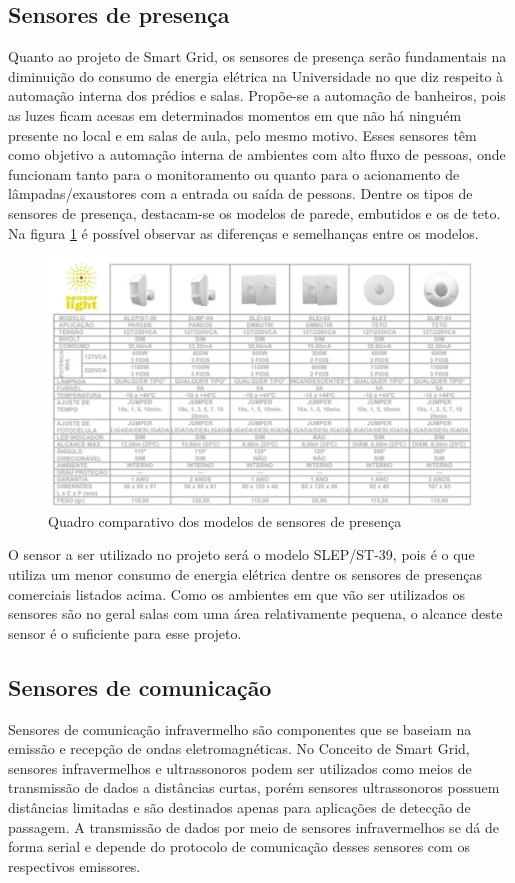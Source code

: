 \subsection{Sensores de presença}
Quanto ao projeto de Smart Grid, os sensores de presença serão fundamentais na diminuição do consumo de energia elétrica na Universidade no que diz respeito à automação interna dos prédios e salas. Propõe-se a automação de banheiros, pois as luzes ficam acesas em determinados momentos em que não há ninguém presente no local e em salas de aula, pelo mesmo motivo. Esses sensores têm como objetivo a automação interna de ambientes com alto fluxo de pessoas, onde funcionam tanto para o monitoramento ou quanto para o acionamento de lâmpadas/exaustores com a entrada ou saída de pessoas. Dentre os tipos de sensores de presença, destacam-se os modelos de parede, embutidos e os de teto. Na figura \ref{fig:sensorpresenca} é possível observar as diferenças e semelhanças entre os modelos.
\begin{figure}[!h]
	\centering
	\includegraphics[width=1.0\textwidth]{figuras/tabelaSensorPresenca.png}
	\caption{Quadro comparativo dos modelos de sensores de presença}
	\label{fig:sensorpresenca}
\end{figure}

O sensor a ser utilizado no projeto será o modelo SLEP/ST-39, pois é o que utiliza um menor consumo de energia elétrica dentre os sensores de presenças comerciais listados acima. Como os ambientes em que vão ser utilizados os sensores são no geral salas com uma área relativamente pequena, o alcance deste sensor é o suficiente para esse projeto. 


\subsection{Sensores de comunicação}
Sensores de comunicação infravermelho são componentes que se baseiam na emissão e recepção de ondas eletromagnéticas. No Conceito de Smart Grid, sensores infravermelhos e ultrassonoros podem ser utilizados como meios de transmissão de dados a distâncias curtas, porém sensores ultrassonoros possuem distâncias limitadas e são destinados apenas para aplicações de detecção de passagem. A transmissão de dados por meio de sensores infravermelhos se dá de forma serial e depende do protocolo de comunicação desses sensores com os respectivos emissores. 

